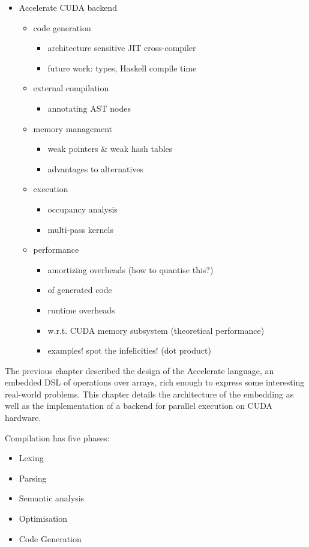 \begin{itemize}
    \item Accelerate CUDA backend
        \begin{itemize}
            \item code generation
                \begin{itemize}
                    \item architecture sensitive JIT cross-compiler
                    \item future work: types, Haskell compile time
                \end{itemize}
            \item external compilation
                \begin{itemize}
                    \item annotating AST nodes
                \end{itemize}
            \item memory management
                \begin{itemize}
                    \item weak pointers \& weak hash tables
                    \item advantages to alternatives
                \end{itemize}
            \item execution
                \begin{itemize}
                    \item occupancy analysis
                    \item multi-pass kernels
                \end{itemize}
            \item performance
                \begin{itemize}
                    \item amortizing overheads (how to quantise this?)
                    \item of generated code
                    \item runtime overheads
                    \item w.r.t. CUDA memory subsystem (theoretical performance)
                    \item examples! spot the infelicities! (dot product)
                \end{itemize}
        \end{itemize}

\end{itemize}


The previous chapter described the design of the Accelerate language, an
embedded DSL of operations over arrays, rich enough to express some interesting
real-world problems. This chapter details the architecture of the embedding as
well as the implementation of a backend for parallel execution on CUDA hardware.



Compilation has five phases:
\begin{itemize}
    \item Lexing
    \item Parsing
    \item Semantic analysis
    \item Optimisation
    \item Code Generation
\end{itemize}

